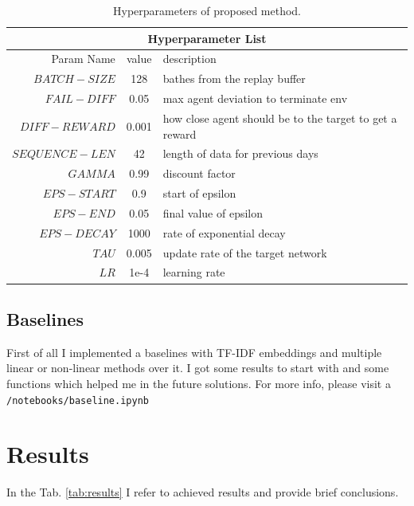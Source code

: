 \documentclass{article}
\begin{document}
\begin{table}[tbh!]
\begin{center}
\begin{tabular}{ |r||c|l|  }
 \hline
 \multicolumn{3}{|c|}{Hyperparameter List} \\
 \hline
 Param Name & value & description \\
 \hline
 $BATCH-SIZE$   & 128    & bathes from the replay buffer\\
 $FAIL-DIFF$ & 0.05 & max agent deviation to terminate env\\ 
 $DIFF-REWARD$ & 0.001 & how close agent should be to the target to get a reward\\
 $SEQUENCE-LEN$ & 42 & length of data for previous days  \\
 $GAMMA$   & 0.99    & discount factor\\
 $EPS-START$ & 0.9    & start of epsilon\\
 $EPS-END$ &  0.05    & final value of epsilon\\
 $EPS-DECAY$ &  1000    & rate of exponential decay\\
 $TAU$ &  0.005    &update rate of the target network\\
 $LR$ &  1e-4    &learning rate\\
 \hline
\end{tabular}
\caption{Hyperparameters of proposed method.}
\label{tab:hyperparams}
\end{center}
\end{table}


\subsection{Baselines}
\label{sec:baseline}
First of all I implemented a baselines with TF-IDF embeddings and multiple linear or non-linear methods over it. 
I got some results to start with and some functions which helped me in the future solutions.
For more info, please visit a \texttt{/notebooks/baseline.ipynb}

\section{Results}
\label{sec:results}

In the Tab. \ref{tab:results} I refer to achieved results and provide brief conclusions.
\end{document}
